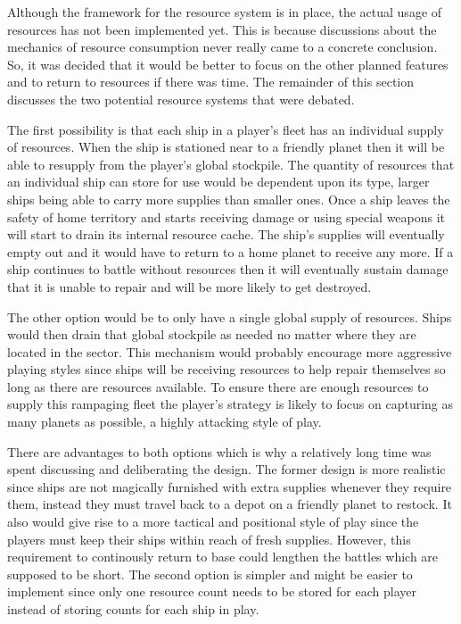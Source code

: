 Although the framework for the resource system is in place, the actual usage of resources has not been implemented yet. This is because discussions about the mechanics of resource consumption never really came to a concrete conclusion. So, it was decided that it would be better to focus on the other planned features and to return to resources if there was time. The remainder of this section discusses the two potential resource systems that were debated.


The first possibility is that each ship in a player's fleet has an individual supply of resources. When the ship is stationed near to a friendly planet then it will be able to resupply from the player's global stockpile. The quantity of resources that an individual ship can store for use would be dependent upon its type, larger ships being able to carry more supplies than smaller ones. Once a ship leaves the safety of home territory and starts receiving damage or using special weapons it will start to drain its internal resource cache. The ship's supplies will eventually empty out and it would have to return to a home planet to receive any more. If a ship continues to battle without resources then it will eventually sustain damage that it is unable to repair and will be more likely to get destroyed.

The other option would be to only have a single global supply of resources. Ships would then drain that global stockpile as needed no matter where they are located in the sector. This mechanism would probably encourage more aggressive playing styles since ships will be receiving resources to help repair themselves so long as there are resources available. To ensure there are enough resources to supply this rampaging fleet the player's strategy is likely to focus on capturing as many planets as possible, a highly attacking style of play.


There are advantages to both options which is why a relatively long time was spent discussing and deliberating the design. The former design is more realistic since ships are not magically furnished with extra supplies whenever they require them, instead they must travel back to a depot on a friendly planet to restock. It also would give rise to a more tactical and positional style of play since the players must keep their ships within reach of fresh supplies. However, this requirement to continously return to base could lengthen the battles which are supposed to be short. The second option is simpler and might be easier to implement since only one resource count needs to be stored for each player instead of storing counts for each ship in play.

